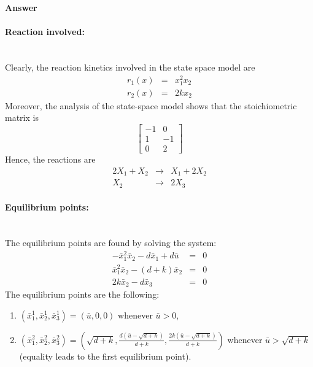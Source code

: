 \textbf{Answer}~\\
\paragraph{Reaction involved:}~\\
Clearly, the reaction kinetics involved in the state space model are
$$
\begin{array}{rcl}
r_1(x)&=&x_1^2x_2\\
r_2(x)&=&2kx_2
\end{array}
$$
Moreover, the analysis of the state-space model shows that the stoichiometric matrix is
$$
\begin{bmatrix}
-1 & 0\\
1 & -1\\
0 & 2
\end{bmatrix}
$$
Hence, the reactions are
$$
\begin{array}{rcl}
2X_1 + X_2 &\rightarrow& X_1 + 2X_2\\
X_2 &\rightarrow& 2X_3
\end{array}
$$

\paragraph{Equilibrium points: }~\\
The equilibrium points are found by solving the system:
$$
\begin{array}{rcl}
-\bar{x}_1^2\bar{x}_2-d\bar{x}_1+d\bar{u}&=&0\\
\bar{x}_1^2\bar{x}_2-(d+k)\bar{x}_2&=&0\\
2k\bar{x}_2-d\bar{x}_3&=&0
\end{array}
$$
The equilibrium points are the following:
\begin{enumerate}
\item $(\bar{x}_1^1,\bar{x}_2^1,\bar{x}_3^1)=(\bar{u},0,0)$ whenever $\bar{u}>0$,
\item $(\bar{x}_1^2,\bar{x}_2^2,\bar{x}_3^2)=(\sqrt{d+k},\frac{d(\bar{u}-\sqrt{d+k})}{d+k},\frac{2k(\bar{u}-\sqrt{d+k})}{d+k})$ whenever $\bar{u}>\sqrt{d+k}$ (equality leads to the first equilibrium point).
\end{enumerate}

